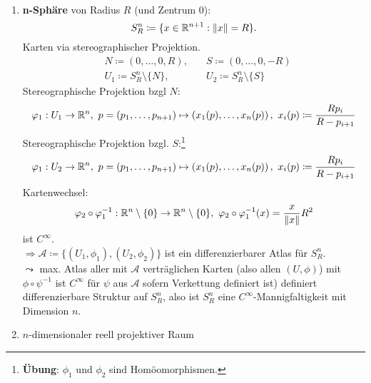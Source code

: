 \begin{example}
  \
  \begin{enumerate}
    \item \textbf{n-Sphäre} von Radius $ R $ (und Zentrum $ 0 $):
      \begin{equation*}
        S_R^n \coloneqq \{ x \in \mathbb{R}^{n+1} : \Vert x \Vert = R \}\text{.}
      \end{equation*}
      Karten via stereographischer Projektion.
      \begin{align*}
        &N \coloneqq (0, \dots, 0, R), \quad &S \coloneqq (0, \dots, 0, -R) \\
        &U_1 \coloneqq S_R^n \setminus \{ N \}, \quad &U_2 \coloneqq S_R^n \setminus \{ S \}
      \end{align*}
      Stereographische Projektion bzgl $ N $:
      \begin{equation*}
        \varphi_1 : U_1 \to \mathbb{R}^n, \ p = (p_1, \dots, p_{n+1}) \mapsto \left( x_1(p), \dots, x_n(p) \right), \ x_i(p) \coloneqq \frac{Rp_i}{R-p_{i+1}}
      \end{equation*}
      Stereographische Projektion bzgl. $ S $:\footnote{\textbf{Übung}: $ \phi_1 $ und $ \phi_2 $ sind Homöomorphismen.}
      \begin{equation*}
        \varphi_1 : U_2 \to \mathbb{R}^n, \ p = (p_1, \dots, p_{n+1}) \mapsto \left( x_1(p), \dots, x_n(p) \right), \ x_i(p) \coloneqq \frac{Rp_i}{R-p_{i+1}}
      \end{equation*}
      Kartenwechsel:
      \begin{equation*}
        \varphi_2 \circ \varphi_1^{-1} : \mathbb{R}^n \setminus \{ 0 \} \to \mathbb{R}^n \setminus \{ 0 \}, \ \varphi_2 \circ \varphi_1^{-1}(x) = \frac{x}{\Vert x \Vert}R^2
      \end{equation*}
      ist $ C^\infty $. \\
      $ \Rightarrow \mathcal{A} \coloneqq \{ (U_1, \phi_1), (U_2, \phi_2) \} $ ist ein differenzierbarer Atlas für $ S_R^n $. \\
      $ \leadsto $ max. Atlas aller mit $ \mathcal{A} $ verträglichen Karten (also allen $ (U, \phi) $) mit $ \phi \circ \psi^{-1} $ ist $ C^\infty $ für $ \psi $ aus $ \mathcal{A} $ sofern Verkettung definiert ist) definiert differenzierbare Struktur auf $ S_R^n $, also ist $ S_R^n $ eine $ C^\infty $-Mannigfaltigkeit mit Dimension $ n $.
    \item $ n $-dimensionaler reell projektiver Raum
      \begin{equation*}

\end{equation*}
\end{enumerate}
\end{example}
